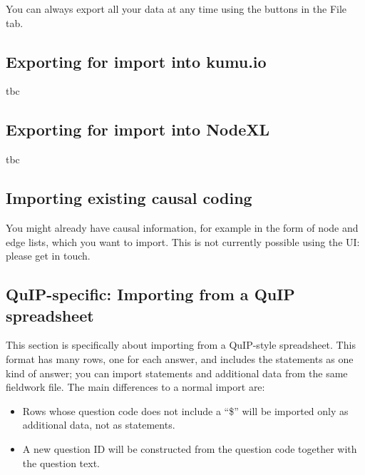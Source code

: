\documentclass[
]{book}
\providecommand{\tightlist}{%
  \setlength{\itemsep}{0pt}\setlength{\parskip}{0pt}}
\begin{document}
You can always export all your data at any time using the buttons in the File tab.

\hypertarget{exporting-for-import-into-kumu.io-1}{%
\subsection{Exporting for import into kumu.io}\label{exporting-for-import-into-kumu.io-1}}

tbc

\hypertarget{exporting-for-import-into-nodexl-1}{%
\subsection{Exporting for import into NodeXL}\label{exporting-for-import-into-nodexl-1}}

tbc

\hypertarget{importing-existing-causal-coding-1}{%
\subsection{Importing existing causal coding}\label{importing-existing-causal-coding-1}}

You might already have causal information, for example in the form of node and edge lists, which you want to import. This is not currently possible using the UI: please get in touch.

\hypertarget{quip-specific-importing-from-a-quip-spreadsheet-1}{%
\subsection{QuIP-specific: Importing from a QuIP spreadsheet}\label{quip-specific-importing-from-a-quip-spreadsheet-1}}

This section is specifically about importing from a QuIP-style spreadsheet. This format has many rows, one for each answer, and includes the statements as one kind of answer; you can import statements and additional data from the same fieldwork file. The main differences to a normal import are:

\begin{itemize}
\tightlist
\item
  Rows whose question code does not include a ``\$'' will be imported only as additional data, not as statements.
\item
  A new question ID will be constructed from the question code together with the question text.
\end{itemize}
\end{document}
